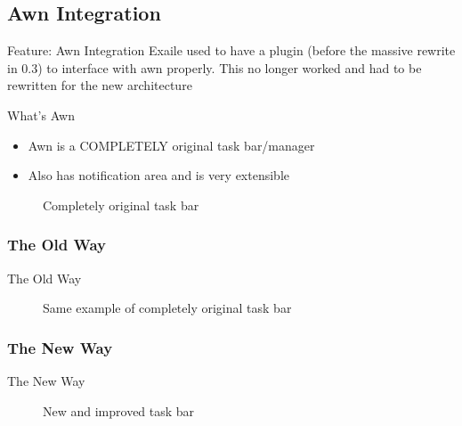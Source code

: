 \documentclass{beamer}
\begin{document}
\subsection{Awn Integration}
\begin{frame}{Feature: Awn Integration}
Exaile used to have a plugin (before the massive rewrite in 0.3) to interface
with awn properly. This no longer worked and had to be rewritten for the new
architecture
\end{frame}

\begin{frame}{What's Awn}
  \begin{itemize}
    \item Awn is a COMPLETELY original task bar/manager
    \item Also has notification area and is very extensible
  \end{itemize}
  \begin{figure}
    \centering
    \caption{Completely original task bar}
  \end{figure}
\end{frame}

\subsubsection{The Old Way}
\begin{frame}{The Old Way}
  \begin{figure}
    \centering
    \caption{Same example of completely original task bar}
  \end{figure}
\end{frame}

\subsubsection{The New Way}
\begin{frame}{The New Way}
  \begin{figure}
    \centering
    \caption{New and improved task bar}
  \end{figure}
\end{frame}
\end{document}
